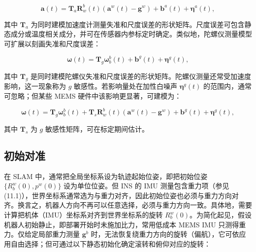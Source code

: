 \begin{equation}
\mathbf {a} (t) = \boldsymbol {T} _ {a} \boldsymbol {R} _ {w} ^ {b} (t) (\mathbf {a} ^ {w} (t) - \mathbf {g} ^ {w}) + \mathbf {b} ^ {a} (t) + \boldsymbol {\eta} ^ {a} (t),\tag{11.3}
\end{equation}

其中 $\boldsymbol T_a$ 为同时建模加速度计测量失准和尺度误差的形状矩阵。尺度误差可包含静态成分或温度相关成分，并可在传感器内参标定时确定。类似地，陀螺仪测量模型可扩展以刻画失准和尺度误差：

\begin{equation}
\pmb {\omega} (t) = \pmb {T} _ {g}   \pmb {\omega} _ {b} ^ {b} (t) + \mathbf {b} ^ {g} (t) + \pmb {\eta} ^ {g} (t),\tag{11.4}
\end{equation}

其中 $\boldsymbol T_g$ 是同时建模陀螺仪失准和尺度误差的形状矩阵。陀螺仪测量还常受加速度影响，这一现象称为 $g$ 敏感性。若影响量处在加性白噪声 $\boldsymbol\eta^g(t)$ 的范围内，通常可忽略；但某些 MEMS 硬件中该影响更显著，可建模为：

\begin{equation}
\pmb {\omega} (t) = \pmb {T} _ {g} \pmb {\omega} _ {b} ^ {b} (t) + \pmb {T} _ {s} \pmb {R} _ {w} ^ {b} (t) (\mathbf {a} ^ {w} (t) - \mathbf {g} ^ {w}) + \mathbf {b} ^ {g} (t) + \pmb {\eta} ^ {g} (t),\tag{11.5}
\end{equation}

其中 $\boldsymbol T_s$ 为 $g$ 敏感性矩阵，可在标定期间估计。

\subsection{初始对准}

在 SLAM 中，通常把全局坐标系设为轨迹起始位姿，即把初始位姿 $\{R_b^w(0),p^w(0)\}$ 设为单位位姿。但 INS 的 IMU 测量包含重力项（参见 (11.1)），世界坐标系通常选为与重力对齐，因此初始位姿也必须与重力方向对齐。换言之，机器人方向不再可以任意选择，必须与重力方向一致。具体地，需要计算把机体（IMU）坐标系对齐到世界坐标系的旋转 $R_b^w(0)$。为简化起见，假设机器人初始静止，即部署开始时未施加比力，常用低成本 MEMS IMU 只测得重力。仅给定局部重力测量 $\mathbf g^b$ 时，无法恢复绕重力方向的旋转（偏航），它可依应用自由选择；但可通过以下静态初始化确定滚转和俯仰对应的旋转：


